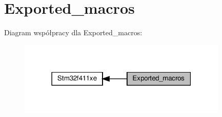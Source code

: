 \hypertarget{group___exported__macros}{}\section{Exported\+\_\+macros}
\label{group___exported__macros}
Diagram współpracy dla Exported\+\_\+macros\+:\nopagebreak
\begin{figure}[H]
\begin{center}
\leavevmode
\includegraphics[width=283pt]{group___exported__macros}
\end{center}
\end{figure}
